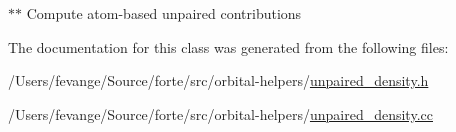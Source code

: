 $\ast$$\ast$ Compute atom-\/based unpaired contributions 

The documentation for this class was generated from the following files\+:\begin{DoxyCompactItemize}
\item 
/\+Users/fevange/\+Source/forte/src/orbital-\/helpers/\mbox{\hyperlink{unpaired__density_8h}{unpaired\+\_\+density.\+h}}\item 
/\+Users/fevange/\+Source/forte/src/orbital-\/helpers/\mbox{\hyperlink{unpaired__density_8cc}{unpaired\+\_\+density.\+cc}}\end{DoxyCompactItemize}

